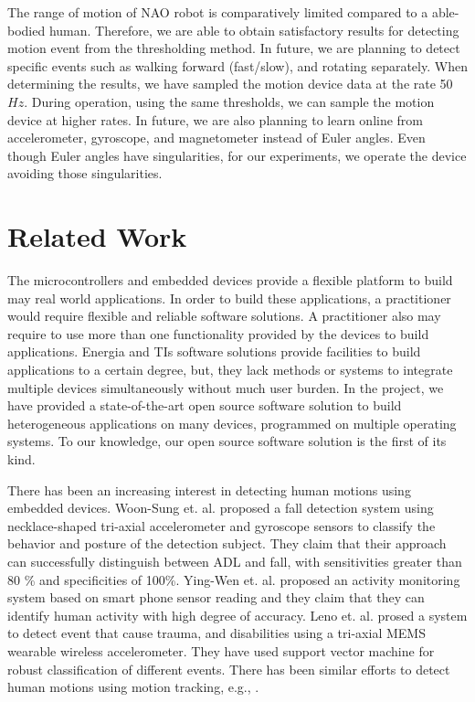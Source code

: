 \documentclass{llncs}
\begin{document}
\begin{sloppy}
The range of motion of NAO robot is comparatively limited compared to a able-bodied human.
Therefore, we are able to obtain satisfactory results for detecting motion event from the
thresholding method. In future, we are planning to detect specific events such as walking forward
(fast/slow), and rotating separately. When determining the results, we have sampled the motion
device data at the rate 50$Hz$. During operation, using the same thresholds, we can sample the
motion device at higher rates. In future, we are also planning to learn online from accelerometer,
gyroscope, and magnetometer instead of Euler angles. Even though Euler angles have singularities,
for our experiments, we operate the device avoiding those singularities.  


\section{Related Work}

The microcontrollers and embedded devices provide a flexible platform to build may real world
applications. In order to build these applications, a practitioner would require  flexible and
reliable software solutions. A practitioner also may require to use more than one functionality
provided by the devices to build applications. Energia and TIs software solutions provide
facilities to build applications to a certain degree, but, they lack methods or systems to integrate
multiple devices simultaneously without much user burden. In the project, we have provided a
state-of-the-art open source software solution to build heterogeneous applications on many devices,
programmed on multiple operating systems. To our knowledge, our open source software solution is the
first of its kind. 

There has been an increasing interest in detecting human motions using embedded devices. Woon-Sung
et. al. \cite{baek2013real} proposed  a fall  detection  system  using necklace-shaped tri-axial
accelerometer  and  gyroscope  sensors  to  classify  the  behavior  and  posture  of  the detection
 subject. They claim that their  approach  can  successfully  distinguish between  ADL and  fall, 
with  sensitivities  greater  than  80 \%  and specificities  of  100\%. Ying-Wen et. al.
\cite{bai2013recognition} proposed an activity monitoring system based on smart phone sensor
reading and they claim that they can identify human activity with high degree of accuracy. Leno et.
al. \cite{leone2013supervised} prosed a system to detect event that cause trauma, and disabilities
using a tri-axial MEMS wearable wireless accelerometer. They have used support vector machine for
robust classification of different events. There has been similar efforts to detect human motions
using motion tracking, e.g., \cite{dumitrache2013fall,kumarwearable,liang2012pre}.


\end{sloppy}
\end{document}
